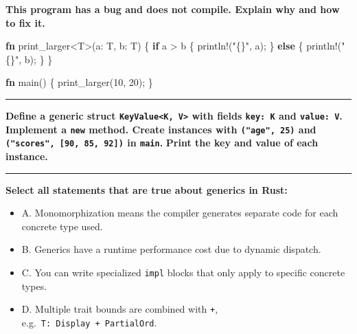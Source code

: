 \documentclass[
  11pt,
]{article}
\newenvironment{Shaded}{}{}
\newcommand{\ControlFlowTok}[1]{\textcolor[rgb]{0.00,0.44,0.13}{\textbf{#1}}}
\newcommand{\DecValTok}[1]{\textcolor[rgb]{0.25,0.63,0.44}{#1}}
\newcommand{\KeywordTok}[1]{\textcolor[rgb]{0.00,0.44,0.13}{\textbf{#1}}}
\newcommand{\NormalTok}[1]{#1}
\newcommand{\OperatorTok}[1]{\textcolor[rgb]{0.40,0.40,0.40}{#1}}
\newcommand{\PreprocessorTok}[1]{\textcolor[rgb]{0.74,0.48,0.00}{#1}}
\newcommand{\StringTok}[1]{\textcolor[rgb]{0.25,0.44,0.63}{#1}}
\providecommand{\tightlist}{%
  \setlength{\itemsep}{0pt}\setlength{\parskip}{0pt}}
\begin{document}
\textbf{This program has a bug and does not compile. Explain why and how
to fix it.}

\begin{Shaded}
\begin{Highlighting}[]
\KeywordTok{fn}\NormalTok{ print\_larger}\OperatorTok{\textless{}}\NormalTok{T}\OperatorTok{\textgreater{}}\NormalTok{(a}\OperatorTok{:}\NormalTok{ T}\OperatorTok{,}\NormalTok{ b}\OperatorTok{:}\NormalTok{ T) }\OperatorTok{\{}
    \ControlFlowTok{if}\NormalTok{ a }\OperatorTok{\textgreater{}}\NormalTok{ b }\OperatorTok{\{}
        \PreprocessorTok{println!}\NormalTok{(}\StringTok{"\{\}"}\OperatorTok{,}\NormalTok{ a)}\OperatorTok{;}
    \OperatorTok{\}} \ControlFlowTok{else} \OperatorTok{\{}
        \PreprocessorTok{println!}\NormalTok{(}\StringTok{"\{\}"}\OperatorTok{,}\NormalTok{ b)}\OperatorTok{;}
    \OperatorTok{\}}
\OperatorTok{\}}

\KeywordTok{fn}\NormalTok{ main() }\OperatorTok{\{}
\NormalTok{    print\_larger(}\DecValTok{10}\OperatorTok{,} \DecValTok{20}\NormalTok{)}\OperatorTok{;}
\OperatorTok{\}}
\end{Highlighting}
\end{Shaded}

\begin{center}\rule{0.5\linewidth}{0.5pt}\end{center}

\textbf{Define a generic struct
\texttt{KeyValue\textless{}K,\ V\textgreater{}} with fields
\texttt{key:\ K} and \texttt{value:\ V}. Implement a \texttt{new}
method. Create instances with \texttt{("age",\ 25)} and
\texttt{("scores",\ {[}90,\ 85,\ 92{]})} in \texttt{main}.}
\textbf{Print the key and value of each instance.}

\begin{Shaded}
\begin{Highlighting}[]

\end{Highlighting}
\end{Shaded}

\begin{center}\rule{0.5\linewidth}{0.5pt}\end{center}

\textbf{Select all statements that are true about generics in Rust:}

\begin{itemize}
\tightlist
\item[$\square$]
  A. Monomorphization means the compiler generates separate code for
  each concrete type used.
\item[$\square$]
  B. Generics have a runtime performance cost due to dynamic dispatch.
\item[$\square$]
  C. You can write specialized \texttt{impl} blocks that only apply to
  specific concrete types.
\item[$\square$]
  D. Multiple trait bounds are combined with \texttt{+},
  e.g.~\texttt{T:\ Display\ +\ PartialOrd}.
\end{itemize}
\end{document}

